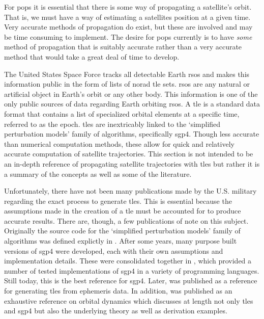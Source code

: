 For \gls{pops} it is essential that there is some way of propagating a
satellite's orbit. That is, we must have a way of estimating a satellites
position at a given time. Very accurate methods of propagation do exist, but
these are involved and may be time consuming to implement. The desire for
\gls{pops} currently is to have \textit{some} method of propagation that is
suitably accurate rather than a very accurate method that would take a great
deal of time to develop.

The United States Space Force tracks all detectable Earth \glspl{rso} and makes
this information public in the form of lists of \gls{norad} \gls{tle} sets.
\glspl{rso} are any natural or artificial object in Earth's orbit or any other
body.  This information is one of the only public sources of data regarding
Earth orbiting \glspl{rso}. A \gls{tle} is a standard data format that contains
a list of specialized orbital elements at a specific time, referred to as the
epoch. \glspl{tle} are inextricably linked to the `simplified perturbation
models' family of algorithms, specifically \gls{sgp4}. Though less accurate
than numerical computation methods, these allow for quick and relatively
accurate computation of satellite trajectories. This section is not intended to
be an in-depth reference of propagating satellite trajectories with \glspl{tle}
but rather it is a summary of the concepts as well as some of the literature.

Unfortunately, there have not been many publications made by the U.S. military
regarding the exact process to generate \glspl{tle}. This is essential because
the assumptions made in the creation of a \gls{tle} must be accounted for to
produce accurate results. There are, though, a few publications of note on this
subject. Originally the source code for the `simplified perturbation models'
family of algorithms was defined explictly in \cite{hoots_spacetrack_1980}.
After some years, many purpose built versions of \gls{sgp4} were developed,
each with their own assumptions and implementation details. These were
consolidated together in \cite{vallado_revisiting_2006}, which provided a
number of tested implementations of \gls{sgp4} in a variety of programming
languages. Still today, this is the best reference for \gls{sgp4}. Later,
\cite{vallado_sgp4_2008} was published as a reference for generating
\glspl{tle} from ephemeris data. In addition, \cite{vallado_fundamentals_2001}
was published as an exhaustive reference on orbital dynamics which discusses at
length not only \glspl{tle} and \gls{sgp4} but also the underlying theory as
well as derivation examples.



